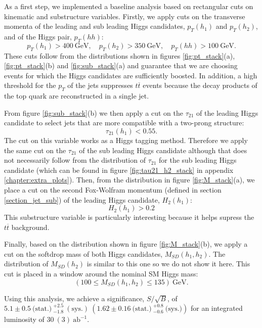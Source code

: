 As a first step, we implemented a baseline analysis based on rectangular cuts on kinematic and substructure variables. Firstly, we apply cuts on the transverse momenta of the leading and sub leading Higgs candidates, $p_T(h_1)$ and $p_T(h_2)$, and of the Higgs pair, $p_T(hh)$:
\begin{equation}
	p_T(h_1)>400 ~\text{GeV}, \quad p_T(h_2)>350 ~\text{GeV}, \quad p_T(hh)>100 ~\text{GeV}.
\end{equation}
These cuts follow from the distributions shown in figures \ref{fig:pt_stack}(a), \ref{fig:pt_stack}(b) and \ref{fig:sub_stack}(a) and guarantee that we are choosing events for which the Higgs candidates are sufficiently boosted. In addition, a high threshold for the $p_T$ of the jets suppresses $t\overline{t}$ events because the decay products of the top quark are reconstructed in a single jet.

From figure \ref{fig:sub_stack}(b) we then apply a cut on the $\tau_{21}$ of the leading Higgs candidate to select jets that are more compatible with a two-prong structure:
\begin{equation}
	\tau_{21}(h_1)<0.55.
\end{equation}
The cut on this variable works as a Higgs tagging method. Therefore we apply the same cut on the $\tau_{21}$ of the sub leading Higgs candidate although that does not necessarily follow from the distribution of $\tau_{21}$ for the sub leading Higgs candidate (which can be found in figure \ref{fig:tau21_h2_stack} in appendix \ref{chapter:extra_plots}).
Then, from the distribution in figure \ref{fig:M_stack}(a), we place a cut on the second Fox-Wolfram momentum (defined in section \ref{section_jet_sub}) of the leading Higgs candidate, $H_2 (h_1)$:
\begin{equation}
	H_2 (h_1)>0.2
\end{equation}
This substructure variable is particularly interesting because it helps supress the $t\overline{t}$ background.

Finally, based on the distribution shown in figure \ref{fig:M_stack}(b), we apply a cut on the softdrop mass of both Higgs candidates, $M_{SD}(h_1,h_2)$. The distribution of $M_{SD}(h_2)$ is similar to this one so we do not show it here. This cut is placed in a window around the nominal SM Higgs mass:
\begin{equation}
	(100\leq M_{SD}(h_1,h_2)\leq 135) ~\text{GeV}.
\end{equation}

Using this analysis, we achieve a significance, $S/\sqrt{B}$, of $5.1\pm0.5~\text{(stat.)}~ ^{+2.5}_{-1.8}~(\text{sys.})~(1.62\pm 0.16~\text{(stat.)}~^{+0.8}_{-0.6}~\text{(sys.)})$ for an integrated luminosity of $30~(3)~\text{ab}^{-1}$.

